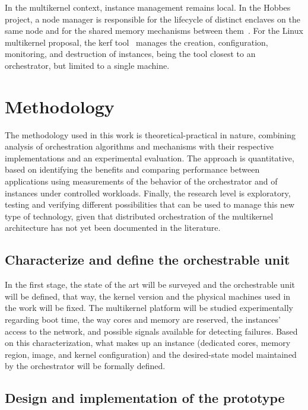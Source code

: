 \documentclass[12pt]{article}
\begin{document}
In the multikernel context, instance management remains local. In the Hobbes project, a node manager is
responsible for the lifecycle of distinct enclaves on the same node and for the shared memory mechanisms between
them~\cite{kocoloski2015composition}. For the Linux multikernel proposal, the kerf tool~\cite{multikernel2025kerf}
manages the creation, configuration, monitoring, and destruction of instances, being the tool closest
to an orchestrator, but limited to a single machine.

\section{Methodology} \label{sec:methods}

The methodology used in this work is theoretical-practical in nature, combining analysis of orchestration algorithms and
mechanisms with their respective implementations and an experimental evaluation.
The approach is quantitative, based on identifying the benefits and comparing performance
between applications using measurements of the behavior of the orchestrator and of instances under controlled workloads.
Finally, the research level is exploratory, testing and verifying different possibilities that
can be used to manage this new type of technology, given that distributed orchestration of the multikernel
architecture has not yet been documented in the literature.

\subsection{Characterize and define the orchestrable unit}\label{subsec:caracterizar-e-definir-a-unidade-orquestravel}

In the first stage, the state of the art will be surveyed and the orchestrable unit will be defined, that way, the kernel version and the physical machines
used in the work will be fixed.
The multikernel platform will be studied experimentally regarding boot time, the way cores and
memory are reserved, the instances' access to the network, and possible signals available for detecting failures.
Based on this characterization, what makes up an instance (dedicated
cores, memory region, image, and kernel configuration) and the desired-state model maintained by the orchestrator will be formally defined.

\subsection{Design and implementation of the prototype}\label{subsec:projeto-e-implementacao-do-prototipo}
\end{document}
